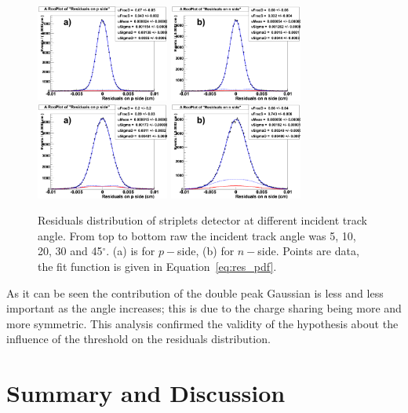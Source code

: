 \begin{figure}[!htpb]
\includegraphics[width=0.39\textwidth]{res_pside_30deg.pdf}
\includegraphics[width=0.39\textwidth]{res_nside_30deg.pdf}
\includegraphics[width=0.39\textwidth]{res_pside_45deg.pdf}
\includegraphics[width=0.39\textwidth]{res_nside_45deg.pdf}
\caption{\label{fig:res_angles}Residuals distribution of striplets detector at different incident track angle. From top to bottom raw the incident track angle was 5, 10, 20, 30 and 45$^{\circ}$. 
(a) is for $p-$side, (b) for $n-$side. Points are data, the fit function is given in Equation~\ref{eq:res_pdf}.}
\end{figure}

As it can be seen the contribution of the double peak Gaussian is less and less important as the 
angle increases; this is due to the charge sharing being more and more symmetric. This analysis 
confirmed the validity of the hypothesis about the influence of the threshold on the residuals 
distribution.


 \section{Summary and Discussion}
 
